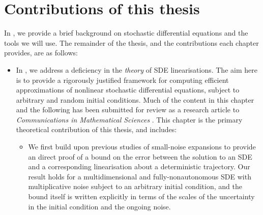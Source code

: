 \section{Contributions of this thesis}
In , we provide a brief background on stochastic differential equations and the tools we will use.
The remainder of the thesis, and the contributions each chapter provides, are as follows:
\begin{itemize}
	\item In , we address a deficiency in the \emph{theory} of SDE linearisations. %
	      The aim here is to provide a rigorously justified framework for computing efficient approximations of nonlinear stochastic differential equations, subject to arbitrary and random initial conditions.
	      Much of the content in this chapter and the following  has been submitted for review as a research article to \emph{Communications in Mathematical Sciences} \citep{BlakeEtAl_2023_ConvergenceStochasticDifferential}.
	      This chapter is the primary theoretical contribution of this thesis, and includes:

	      \begin{itemize}
		      \item We first build upon previous studies of small-noise expansions \cite[e.g.]{Sanz-AlonsoStuart_2017_GaussianApproximationsSmall,Blagoveshchenskii_1962_DiffusionProcessesDepending,FreidlinWentzell_1998_RandomPerturbationsDynamical} to provide an direct proof of a bound on the error between the solution to an SDE and a corresponding linearisation about a deterministic trajectory.
		            Our result holds for a multidimensional and fully-nonautonomous SDE with multiplicative noise subject to an arbitrary initial condition, and the bound itself is written explicitly in terms of the scales of the uncertainty in the initial condition and the ongoing noise.




\end{itemize}
\end{itemize}
